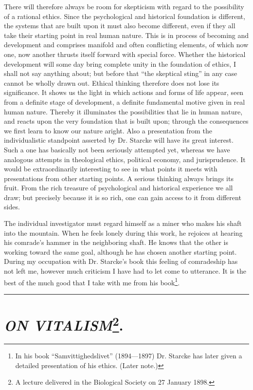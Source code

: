 \documentclass[12pt,a4paper,openany]{book}
\newcommand{\opage}[1]{\marginnote{\footnotesize\textit{[#1]}}}
\newcommand{\essay}[2][]{\chapter*{#2}\addcontentsline{toc}{chapter}{#1}}
\newcommand{\streg}{\begin{center}\rule{3em}{0.4pt}\end{center}}
\begin{document}
There will therefore always be room for skepticism with
regard to the possibility of a rational ethics. Since the
psychological and historical foundation is different, the
systems that are built upon it must also become different, even if they
all take their starting point in real human nature.
This is in process of becoming and development and comprises manifold
and often conflicting elements, of which now one, now
another thrusts itself forward with special force. Whether the historical
development will some day bring complete unity in the
foundation of ethics, I shall not say anything about; but before that
``the skeptical sting'' in any case cannot be wholly drawn out. Ethical
thinking therefore does not lose its significance. It shows
us the light in which actions and forms of life appear,
seen from a definite stage of development, a definite fundamental motive given in
real human nature. Thereby it illuminates
the possibilities that lie in human nature, and reacts
upon the very foundation that is built upon; through the
consequences we first learn to know our nature aright.
Also a presentation from the individualistic
standpoint asserted by Dr. Starcke will have its great interest. Such a one
has basically not been seriously attempted yet, whereas we
have analogous attempts in theological ethics,
political economy, and jurisprudence. It would be extraordinarily interesting
to see in what points it meets with presentations from
other starting points. A serious thinking always brings
its fruit. From the rich treasure of psychological and historical experience
we all draw; but precisely because it is so rich, one can
gain access to it from different sides.

The individual investigator must regard himself as a miner
who makes his shaft into the mountain. When he feels
lonely during this work, he rejoices at hearing
his comrade's hammer in the neighboring shaft. He knows that the
other is working toward the same goal, although he has chosen
\opage{39}another starting point. During my occupation with Dr.
Starcke's book this feeling of comradeship has not left
me, however much criticism I have had to let come to
utterance. It is the best of the much good that I take with me from
his book\footnote{In his book ``Samvittighedslivet'' (1894---1897) Dr. Starcke has later
given a detailed presentation of his ethics. (Later note.)}.

\streg{}

\opage{40}
\essay[\emph{On Vitalism}]{\emph{ON VITALISM}\footnote{A lecture delivered in the Biological Society on 27 January 1898.}.}
\end{document}
